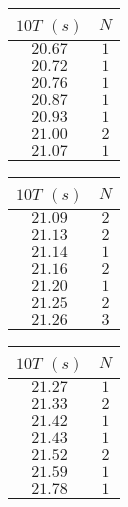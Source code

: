 \documentclass[12pt, a4paper]{article}
\begin{document}
\begin{table}[!htb]
    \begin{minipage}[t]{.3\linewidth}
    \centering
        \begin{tabular}{|c|c|}
            \hline
            $10T$ $(s)$&$N$\\
            \hline
            $20.67$ & $1$\\
            $20.72$ & $1$\\
            $20.76$ & $1$\\
            $20.87$ & $1$\\
            $20.93$ & $1$\\
            $21.00$ & $2$\\
            $21.07$ & $1$\\
            \hline
        \end{tabular}
    \end{minipage}
    \begin{minipage}[t]{.3\linewidth}
    \centering
        \begin{tabular}{|c|c|}
            \hline
            $10T$ $(s)$&$N$\\
            \hline
            $21.09$ & $2$\\
            $21.13$ & $2$\\
            $21.14$ & $1$\\
            $21.16$ & $2$\\
            $21.20$ & $1$\\
            $21.25$ & $2$\\
            $21.26$ & $3$\\
            \hline
        \end{tabular}
    \end{minipage}
    \begin{minipage}[t]{.3\linewidth}
    \centering
        \begin{tabular}{|c|c|}
            \hline
            $10T$ $(s)$&$N$\\
            \hline
            $21.27$ & $1$\\
            $21.33$ & $2$\\
            $21.42$ & $1$\\
            $21.43$ & $1$\\
            $21.52$ & $2$\\
            $21.59$ & $1$\\
            $21.78$ & $1$\\
            \hline
        \end{tabular}
    \end{minipage} 
\end{table}
\end{document}

